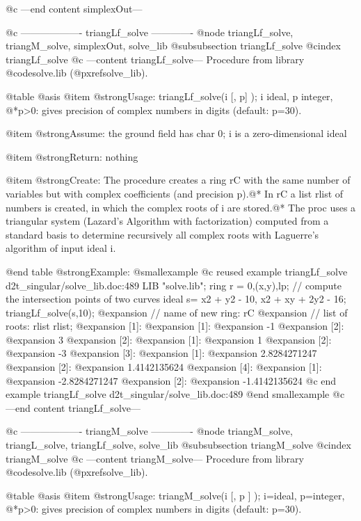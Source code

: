 @c ---end content simplexOut---

@c ------------------- triangLf_solve -------------
@node triangLf_solve, triangM_solve, simplexOut, solve_lib
@subsubsection triangLf_solve
@cindex triangLf_solve
@c ---content triangLf_solve---
Procedure from library @code{solve.lib} (@pxref{solve_lib}).

@table @asis
@item @strong{Usage:}
triangLf_solve(i [, p] ); i ideal, p integer,
@*p>0: gives precision of complex numbers in digits (default: p=30).

@item @strong{Assume:}
the ground field has char 0; i is a zero-dimensional ideal

@item @strong{Return:}
nothing

@item @strong{Create:}
The procedure creates a ring rC with the same number of variables but
with complex coefficients (and precision p).@*
In rC a list rlist of numbers is created, in which the complex
roots of i are stored.@*
The proc uses a triangular system (Lazard's Algorithm with
factorization) computed from a standard basis to determine recursively
all complex roots with Laguerre's algorithm of input ideal i.

@end table
@strong{Example:}
@smallexample
@c reused example triangLf_solve d2t_singular/solve_lib.doc:489 
LIB "solve.lib";
ring r = 0,(x,y),lp;
// compute the intersection points of two curves
ideal s=  x2 + y2 - 10, x2 + xy + 2y2 - 16;
triangLf_solve(s,10);
@expansion{} // name of new ring: rC
@expansion{} // list of roots: rlist
rlist;
@expansion{} [1]:
@expansion{}    [1]:
@expansion{}       -1
@expansion{}    [2]:
@expansion{}       3
@expansion{} [2]:
@expansion{}    [1]:
@expansion{}       1
@expansion{}    [2]:
@expansion{}       -3
@expansion{} [3]:
@expansion{}    [1]:
@expansion{}       2.8284271247
@expansion{}    [2]:
@expansion{}       1.4142135624
@expansion{} [4]:
@expansion{}    [1]:
@expansion{}       -2.8284271247
@expansion{}    [2]:
@expansion{}       -1.4142135624
@c end example triangLf_solve d2t_singular/solve_lib.doc:489
@end smallexample
@c ---end content triangLf_solve---

@c ------------------- triangM_solve -------------
@node triangM_solve, triangL_solve, triangLf_solve, solve_lib
@subsubsection triangM_solve
@cindex triangM_solve
@c ---content triangM_solve---
Procedure from library @code{solve.lib} (@pxref{solve_lib}).

@table @asis
@item @strong{Usage:}
triangM_solve(i [, p ] ); i=ideal, p=integer,
@*p>0: gives precision of complex numbers in digits (default: p=30).

